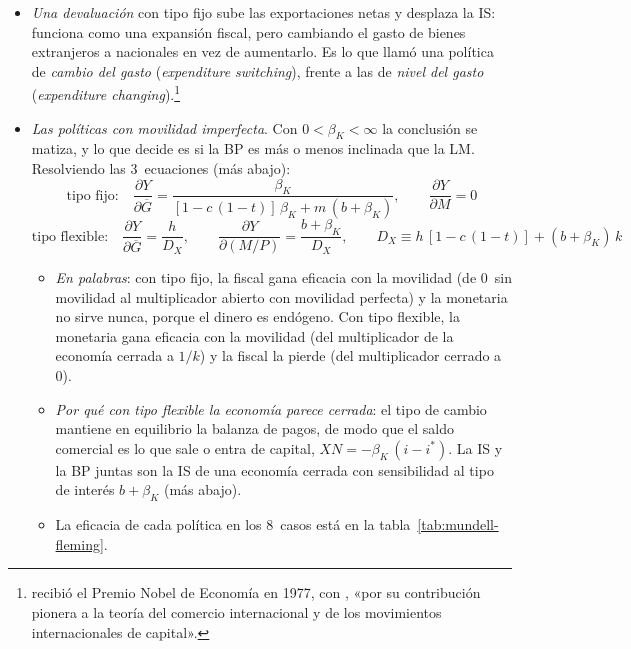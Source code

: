 \documentclass[11pt]{article}
\begin{document}
\begin{itemize}
\begin{itemize}
  \end{itemize}
\item \emph{Una devaluación} con tipo fijo sube las exportaciones netas y desplaza la IS: funciona como una expansión fiscal, pero cambiando el gasto de bienes extranjeros a nacionales en vez de aumentarlo. Es lo que \textcite{Meade1951} llamó una política de \emph{cambio del gasto} (\emph{expenditure switching}), frente a las de \emph{nivel del gasto} (\emph{expenditure changing}).\footnote{ recibió el Premio Nobel de Economía en 1977, con , «por su contribución pionera a la teoría del comercio internacional y de los movimientos internacionales de capital»\nocite{Nobel1977MeadeOhlin}.}
\end{itemize}

\begin{itemize}
\item \emph{Las políticas con movilidad imperfecta}. Con $0<\beta_K<\infty$ la conclusión se matiza, y lo que decide es si la BP es más o menos inclinada que la LM. Resolviendo las 3~ecuaciones (más abajo):
  \begin{equation}
  \text{tipo fijo:}\quad \frac{\partial Y}{\partial\overline{G}}=\frac{\beta_K}{[1-c\,(1-t)]\,\beta_K+m\,(b+\beta_K)},\qquad \frac{\partial Y}{\partial M}=0 \label{eq:multiplicadores-fijo}
  \end{equation}
  \begin{equation}
  \text{tipo flexible:}\quad \frac{\partial Y}{\partial\overline{G}}=\frac{h}{D_X},\qquad \frac{\partial Y}{\partial(M/P)}=\frac{b+\beta_K}{D_X},\qquad D_X\equiv h\,[1-c\,(1-t)]+(b+\beta_K)\,k \label{eq:multiplicadores-flexible}
  \end{equation}
  \begin{itemize}
  \item \emph{En palabras}: con tipo fijo, la fiscal gana eficacia con la movilidad (de 0~sin movilidad al multiplicador abierto con movilidad perfecta) y la monetaria no sirve nunca, porque el dinero es endógeno. Con tipo flexible, la monetaria gana eficacia con la movilidad (del multiplicador de la economía cerrada a $1/k$) y la fiscal la pierde (del multiplicador cerrado a 0).
  \item \emph{Por qué con tipo flexible la economía parece cerrada}: el tipo de cambio mantiene en equilibrio la balanza de pagos, de modo que el saldo comercial es lo que sale o entra de capital, $XN=-\beta_K\,(i-i^*)$. La IS y la BP juntas son la IS de una economía cerrada con sensibilidad al tipo de interés $b+\beta_K$ (más abajo).
  \item La eficacia de cada política en los 8~casos está en la tabla~\ref{tab:mundell-fleming}.
  \end{itemize}
\end{itemize}
\end{document}
